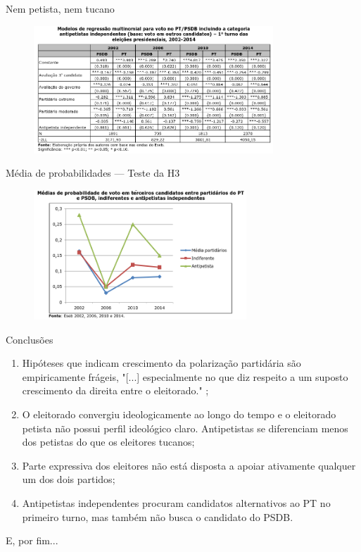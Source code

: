 \documentclass[9pt]{beamer}
\begin{document}
\begin{frame}{Nem petista, nem tucano}
    \begin{figure}[h]
        \includegraphics[width=9cm]{images/voto antipetista.png}
    \end{figure}
\end{frame}

\begin{frame}{Média de probabilidades --- Teste da H3}
    \begin{figure}[h]
        \includegraphics[width=8cm]{images/media de probabilidade.png}
    \end{figure}
\end{frame}

\begin{frame}{Conclusões}
    \begin{enumerate}
        \item Hipóteses que indicam crescimento da polarização partidária são empiricamente frágeis, "[...] especialmente no que diz respeito a um suposto crescimento da direita entre o eleitorado." \cite[p. ~78]{borges};
        \item O eleitorado convergiu ideologicamente ao longo do tempo e o eleitorado petista não possui perfil ideológico claro. Antipetistas se diferenciam menos dos petistas do que os eleitores tucanos;
        \item Parte expressiva dos eleitores não está disposta a apoiar ativamente qualquer um dos dois partidos;
        \item Antipetistas independentes procuram candidatos alternativos ao PT no primeiro turno, mas também não busca o candidato do PSDB.
    \end{enumerate}

E, por fim... \bcsmmh

\end{frame}
\end{document}
